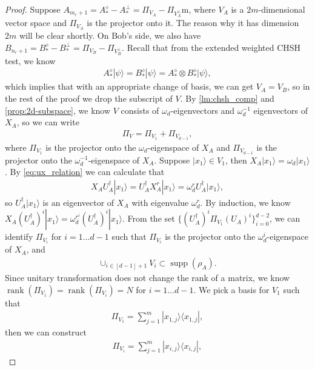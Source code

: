 \documentclass[11pt,letterpaper]{article}
\newcommand{\ket}[1]{|#1\rangle}
\newcommand{\ketbra}[2]{|#1\rangle\langle#2|}
\newcommand{\x}{\otimes}
\DeclareMathOperator{\rank}{rank}
\DeclareMathOperator{\supp}{supp}
\newcommand{\1}{\mathbb{1}}
\theoremstyle{definition}
\begin{document}
\begin{proof}
Suppose $A_{m_r+1} = A_\ast^\diamond- A_\ast^\perp = \Pi_{V_A} - \Pi_{V_A^\perp}$m, where $V_A$ is a
$2m$-dimensional vector space and $\Pi_{V_A}$ is the projector onto it. The reason why it has dimension $2m$
will be clear shortly. On Bob's side, we also have $B_{n_r+1} = B_\ast^\diamond- B_\ast^\perp = \Pi_{V_B} - \Pi_{V_B^\perp}$.
Recall that from the extended weighted CHSH test, we know
\begin{align}
	A_\ast^\diamond \ket{\psi} = B_\ast^\diamond \ket{\psi} = A_\ast^\diamond \x B_\ast^\diamond \ket{\psi},
\end{align}
which implies that with an appropriate change of basis, we can get $V_A = V_B$, so in the rest of the proof
we drop the subscript of $V$.
By \cref{lm:chsh_comp} and \cref{prop:2d-subspace}, we know $V$ consists of $\omega_d$-eigenvectors and $\omega_d^{-1}$ eigenvectors of 
$X_A$, so we can write 
\begin{align}
	\Pi_{V} = \Pi_{V_1} + \Pi_{V_{d-1}},
\end{align}
where $\Pi_{V_{1}}$ is the projector onto the $\omega_d$-eigenspace of $X_A$ and $\Pi_{V_{d-1}}$ is the projector 
onto the $\omega_d^{-1}$-eigenspace of $X_A$.
Suppose $\ket{x_{1}} \in V_{1}$, then $X_A \ket{x_{1}} = \omega_d \ket{x_{1}}$.
By \cref{eq:ux_relation} we can calculate that
\begin{align}
\label{eq:ladder}
 X_AU_A^\dagger \ket{x_{1}} = U_A^\dagger X_A^r \ket{x_{1}} = \omega_d^r U_A^\dagger \ket{x_{1}},
\end{align}
so $U_A^\dagger \ket{x_{1}}$ is an eigenvector of $X_A$ with eigenvalue $\omega_d^r$.
By induction, we know $X_A (U_A^\dagger)^i \ket{x_{1}} = \omega_d^{r^i} (U_A^\dagger)^i\ket{x_{1}}$. 
From the set $\{(U_A^\dagger)^i \Pi_{V_1} (U_A)^i \}_{i=0}^{d-2}$, we can identify $\Pi_{V_i}$ for $i = 1 \dots  d-1$
such that $\Pi_{V_i}$ is the projector onto the $\omega_d^i$-eigenspace of $X_A$,
and 
\begin{align}
 \cup_{i \in [d-1]+1} V_i \subset \supp(\rho_A).
\end{align}
Since unitary transformation does not change the rank of a matrix, we know $\rank(\Pi_{V_1}) = \rank(\Pi_{V_{i}}) =N$
for $ i =1 \dots d-1$.
We pick a basis for $V_1$ such that 
\begin{align}
	\Pi_{V_1} =  \sum_{j=1}^m \ketbra{x_{1,j}}{x_{1,j}},
\end{align}
then we can construct 
\begin{align}
 \Pi_{V_i} = \sum_{j=1}^m \ketbra{x_{i,j}}{x_{i,j}},
\end{align}

\end{proof}
\end{document}
